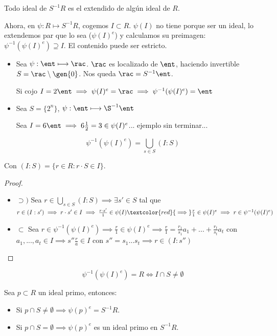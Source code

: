 \obs Todo ideal de $S^{-1}R$ es el extendido de algún ideal de $R$. 
	
Ahora, en $\psi:R \longmapsto S^{-1}R$, cogemos $I \subset R$. $\psi(I)$ no tiene porque ser un ideal, lo extendemos par que lo sea ($\psi(I)^e$) y calculamos su preimagen: $\psi^{-1}(\psi(I)^e) \supseteq I$. El contenido puede ser estricto.

\begin{example}
	\begin{itemize}
		\item Sea $\psi: \ent \longmapsto \rac$. $\rac$ es localizado de $\ent$, haciendo invertible $S=\rac \setminus\gen{0}$. Nos queda $\rac=S^{-1}\ent$.
		
		Si cojo $I=2\ent \implies \psi(I)^e=\rac \implies \psi^{-1}(\psi(I)^e)= \ent$ 
		
		\item Sea $S=\{ 2^n \}$, $\psi: \ent \longmapsto \S^{-1}\ent$
		
		Sea $I=6\ent\implies 6\frac{1}{2}=3 \in \psi(I)^e$... ejemplo sin terminar...
	\end{itemize}
\end{example}

\begin{prop}
	$$\psi^{-1}(\psi(I)^e)=\bigcup_{s\in S}(I:S)$$
	
	Con $(I:S)=\{ r \in R: r\cdot S \in I \}$.
\end{prop}

\begin{proof}
	\begin{itemize}
		\item $\supset)$ Sea $r \in \bigcup_{s\in S}(I:S) \implies \exists s' \in S$ tal que $r \in (I:s')\implies r\cdot s' \in I \implies \frac{r \cdot s'}{1} \in \psi(I) \textcolor{red}{\implies} \frac{r}{1} \in \psi(I)^e \implies r \in \psi^{-1}(\psi(I)^e)$
		\item $\subset$ Sea $r \in \psi^{-1}(\psi(I)^e)\implies \frac{r}{1}\in \psi(I)^e \implies \frac{r}{1}=\frac{r_1}{s_1}a_1+...+\frac{r_t}{s_t}a_t$ con $a_1,...,a_t \in I \implies s''\frac{r}{a}\in I$ con $s''=s_1...s_t \implies r \in (I:s'')$
	\end{itemize}
\end{proof}

\begin{prop}
	$$\psi^{-1}(\psi(I)^e)=R \Leftrightarrow I \cap S \neq \emptyset$$
\end{prop}

\begin{prop}
	Sea $p\subset R$ un ideal primo, entonces:
	\begin{itemize}
		\item Si $p\cap S \neq \emptyset \implies \psi(p)^e=S^{-1}R$.
		\item Si $p\cap S = \emptyset \implies \psi(p)^e$ es un ideal primo en $S^{-1}R$.
	\end{itemize} 
\end{prop}

